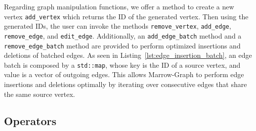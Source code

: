 Regarding graph manipulation functions, we offer a method to create a new vertex \texttt{add\_vertex} which returns the ID of the generated vertex. Then using the generated IDs, the user can invoke the methods \texttt{remove\_vertex}, \texttt{add\_edge}, \texttt{remove\_edge}, and \texttt{edit\_edge}. Additionally, an \texttt{add\_edge\_batch} method and a \texttt{remove\_edge\_batch} method are provided to perform optimized insertions and deletions of batched edges. As seen in Listing~\ref{lst:edge_insertion_batch}, an edge batch is composed by a \texttt{std::map}, whose key is the ID of a source vertex, and value is a vector of outgoing edges. This allows Marrow-Graph to perform edge insertions and deletions optimally by iterating over consecutive edges that share the same source vertex.




\subsection{Operators}
\label{sec:marrow_graph_interface_operators}


